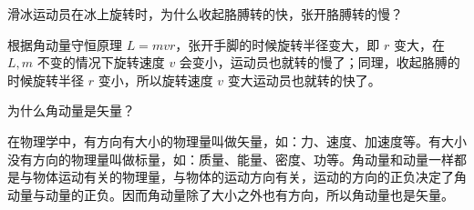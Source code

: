 \begin{example}{}
滑冰运动员在冰上旋转时，为什么收起胳膊转的快，张开胳膊转的慢？

根据角动量守恒原理 $L=mvr$，张开手脚的时候旋转半径变大，即 $r$ 变大，在 $L,m$ 不变的情况下旋转速度 $v$ 会变小，运动员也就转的慢了；同理，收起胳膊的时候旋转半径 $r$ 变小，所以旋转速度 $v$ 变大运动员也就转的快了。
\end{example}
\begin{example}{}
为什么角动量是矢量？

在物理学中，有方向有大小的物理量叫做矢量，如：力、速度、加速度等。有大小没有方向的物理量叫做标量，如：质量、能量、密度、功等。角动量和动量一样都是与物体运动有关的物理量，与物体的运动方向有关，运动的方向的正负决定了角动量与动量的正负。因而角动量除了大小之外也有方向，所以角动量也是矢量。
\end{example}

